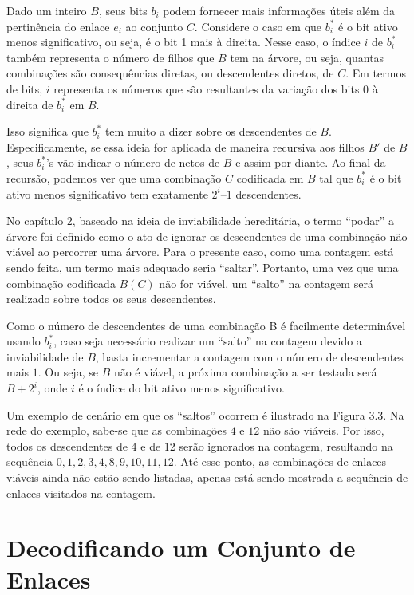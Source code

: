 Dado um inteiro $B$, seus bits $b_i$ podem fornecer mais informações úteis além da pertinência do enlace $e_i$ ao conjunto $C$. Considere o caso em que $b_i^*$ é o bit ativo menos significativo, ou seja, é o bit 1 mais à direita. Nesse caso, o índice $i$ de $b_i^*$ também representa o número de filhos que $B$ tem na árvore, ou seja, quantas combinações são consequências diretas, ou descendentes diretos, de $C$. Em termos de bits, $i$ representa os números que são resultantes da variação dos bits $0$ à direita de $b_i^*$ em $B$.

Isso significa que $b_i^*$ tem muito a dizer sobre os descendentes de $B$. Especificamente, se essa ideia for aplicada de maneira recursiva aos filhos $B'$ de $B$, seus $b_i^*$’s vão indicar o número de netos de $B$ e assim por diante. Ao final da recursão, podemos ver que uma combinação $C$ codificada em $B$ tal que $b_i^*$ é o bit ativo menos significativo tem exatamente $2^i–1$ descendentes.

No capítulo 2, baseado na ideia de inviabilidade hereditária, o termo “podar” a árvore foi definido como o ato de ignorar os descendentes de uma combinação não viável ao percorrer uma árvore. Para o presente caso, como uma contagem está sendo feita, um termo mais adequado seria “saltar”. Portanto, uma vez que uma combinação codificada $B(C)$ não for viável, um “salto” na contagem será realizado sobre todos os seus descendentes.

Como o número de descendentes de uma combinação B é facilmente determinável usando $b_i^*$, caso seja necessário realizar um “salto” na contagem devido a inviabilidade de $B$, basta incrementar a contagem com o número de descendentes mais $1$. Ou seja, se $B$ não é viável, a próxima combinação a ser testada será $B + 2^i$, onde $i$ é o índice do bit ativo menos significativo.


Um exemplo de cenário em que os “saltos” ocorrem é ilustrado na Figura 3.3. Na rede do exemplo, sabe-se que as combinações $4$ e $12$ não são viáveis. Por isso, todos os descendentes de $4$ e de $12$ serão ignorados na contagem, resultando na sequência $0, 1, 2, 3, 4, 8, 9, 10, 11, 12$. Até esse ponto, as combinações de enlaces viáveis ainda não estão sendo listadas, apenas está sendo mostrada a sequência de enlaces visitados na contagem.

\section{Decodificando um Conjunto de Enlaces}

